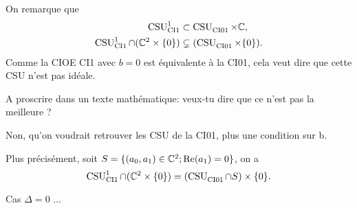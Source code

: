     On remarque que
    \begin{align}
      \CSU[1]{CI1} &\subset \CSU{CI01}\times\CC,
      \\
      \CSU[1]{CI1}\cap(\CC^2 \times \lbrace0\rbrace) &\subsetneq (\CSU{CI01}\times\lbrace0\rbrace).
    \end{align}
      Comme la CIOE CI1 avec \(b=0\) est équivalente à la CI01, cela veut dire que cette CSU n'est pas idéale. 
      \begin{REM}
        A proscrire dans un texte mathématique: veux-tu dire que ce n'est pas la meilleure ?
      \end{REM}
      \begin{REP}
        Non, qu'on voudrait retrouver les CSU de la CI01, plus une condition sur b.
      \end{REP}
      Plus précisément, soit \(S = \lbrace (a_0,a_1) \in \CC^2; \Re(a_1)=0 \rbrace\), on a
    \begin{equation}
      \CSU[1]{CI1}\cap(\CC^2 \times \lbrace0\rbrace) = (\CSU{CI01}\cap S) \times\lbrace0\rbrace. 
    \end{equation}

    \begin{REM}
      Cas \(\Delta=0\) ...
    \end{REM}

